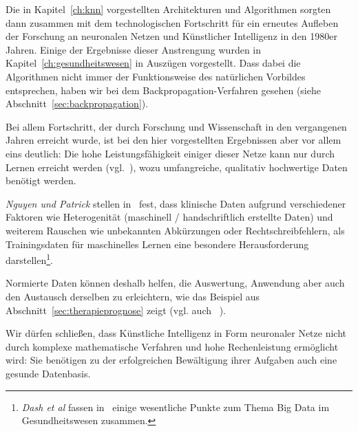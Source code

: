 Die in Kapitel~\ref{ch:knn} vorgestellten Architekturen und Algorithmen sorgten dann zusammen mit dem technologischen Fortschritt für ein erneutes Aufleben der Forschung an neuronalen Netzen und Künstlicher Intelligenz in den 1980er Jahren.
Einige der Ergebnisse dieser Anstrengung wurden in Kapitel~\ref{ch:gesundheitswesen} in Auszügen vorgestellt.
Dass dabei die Algorithmen nicht immer der Funktionsweise des natürlichen Vorbildes entsprechen, haben wir bei dem Backpropagation-Verfahren gesehen (siehe Abschnitt~\ref{sec:backpropagation}).

Bei allem Fortschritt, der durch Forschung und Wissenschaft in den vergangenen Jahren erreicht wurde, ist bei den hier vorgestellten Ergebnissen aber vor allem eins deutlich: Die hohe Leistungsfähigkeit einiger dieser Netze kann nur durch Lernen erreicht werden (vgl.~\cite[40]{AHR19}), wozu umfangreiche, qualitativ hochwertige Daten benötigt werden.

\textit{Nguyen und Patrick} stellen in~\cite{NP16} fest, dass klinische Daten aufgrund verschiedener Faktoren wie Heterogenität (maschinell / handschriftlich erstellte Daten) und weiterem Rauschen wie unbekannten Abkürzungen oder Rechtschreibfehlern, als Trainingsdaten für maschinelles Lernen eine besondere Herausforderung darstellen\footnote{\textit{Dash et al} fassen in~\cite{SSM+19} einige wesentliche Punkte zum Thema Big Data im Gesundheitswesen zusammen.}.

Normierte Daten können deshalb helfen, die Auswertung, Anwendung aber auch den Austausch derselben zu erleichtern, wie das Beispiel aus Abschnitt~\ref{sec:therapieprognose} zeigt (vgl. auch ~\cite[42]{AHR19}).

Wir dürfen schließen, dass Künstliche Intelligenz in Form neuronaler Netze nicht durch komplexe mathematische Verfahren und hohe Rechenleistung ermöglicht wird: Sie benötigen zu der erfolgreichen Bewältigung ihrer Aufgaben auch eine gesunde Datenbasis.












%
%
%
%


